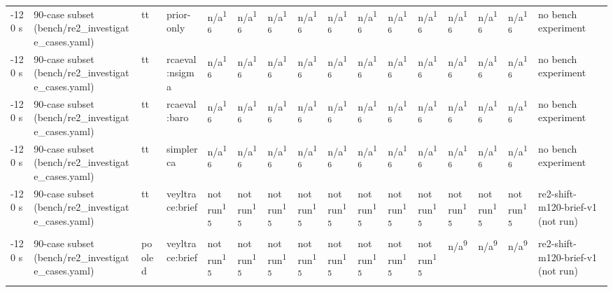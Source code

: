 \begin{table}[t]
\begin{tabular}{llllllllllllllll}
-120 s & 90-case subset (bench/re2\_investigate\_cases.yaml) & tt & prior-only & n/a\textsuperscript{16} & n/a\textsuperscript{16} & n/a\textsuperscript{16} & n/a\textsuperscript{16} & n/a\textsuperscript{16} & n/a\textsuperscript{16} & n/a\textsuperscript{16} & n/a\textsuperscript{16} & n/a\textsuperscript{16} & n/a\textsuperscript{16} & n/a\textsuperscript{16} & no bench experiment \\
-120 s & 90-case subset (bench/re2\_investigate\_cases.yaml) & tt & rcaeval:nsigma & n/a\textsuperscript{16} & n/a\textsuperscript{16} & n/a\textsuperscript{16} & n/a\textsuperscript{16} & n/a\textsuperscript{16} & n/a\textsuperscript{16} & n/a\textsuperscript{16} & n/a\textsuperscript{16} & n/a\textsuperscript{16} & n/a\textsuperscript{16} & n/a\textsuperscript{16} & no bench experiment \\
-120 s & 90-case subset (bench/re2\_investigate\_cases.yaml) & tt & rcaeval:baro & n/a\textsuperscript{16} & n/a\textsuperscript{16} & n/a\textsuperscript{16} & n/a\textsuperscript{16} & n/a\textsuperscript{16} & n/a\textsuperscript{16} & n/a\textsuperscript{16} & n/a\textsuperscript{16} & n/a\textsuperscript{16} & n/a\textsuperscript{16} & n/a\textsuperscript{16} & no bench experiment \\
-120 s & 90-case subset (bench/re2\_investigate\_cases.yaml) & tt & simplerca & n/a\textsuperscript{16} & n/a\textsuperscript{16} & n/a\textsuperscript{16} & n/a\textsuperscript{16} & n/a\textsuperscript{16} & n/a\textsuperscript{16} & n/a\textsuperscript{16} & n/a\textsuperscript{16} & n/a\textsuperscript{16} & n/a\textsuperscript{16} & n/a\textsuperscript{16} & no bench experiment \\
-120 s & 90-case subset (bench/re2\_investigate\_cases.yaml) & tt & veyltrace:brief & not run\textsuperscript{15} & not run\textsuperscript{15} & not run\textsuperscript{15} & not run\textsuperscript{15} & not run\textsuperscript{15} & not run\textsuperscript{15} & not run\textsuperscript{15} & not run\textsuperscript{15} & not run\textsuperscript{15} & not run\textsuperscript{15} & not run\textsuperscript{15} & re2-shift-m120-brief-v1 (not run) \\
-120 s & 90-case subset (bench/re2\_investigate\_cases.yaml) & pooled & veyltrace:brief & not run\textsuperscript{15} & not run\textsuperscript{15} & not run\textsuperscript{15} & not run\textsuperscript{15} & not run\textsuperscript{15} & not run\textsuperscript{15} & not run\textsuperscript{15} & not run\textsuperscript{15} & n/a\textsuperscript{9} & n/a\textsuperscript{9} & n/a\textsuperscript{9} & re2-shift-m120-brief-v1 (not run) \\

\end{tabular}
\end{table}
